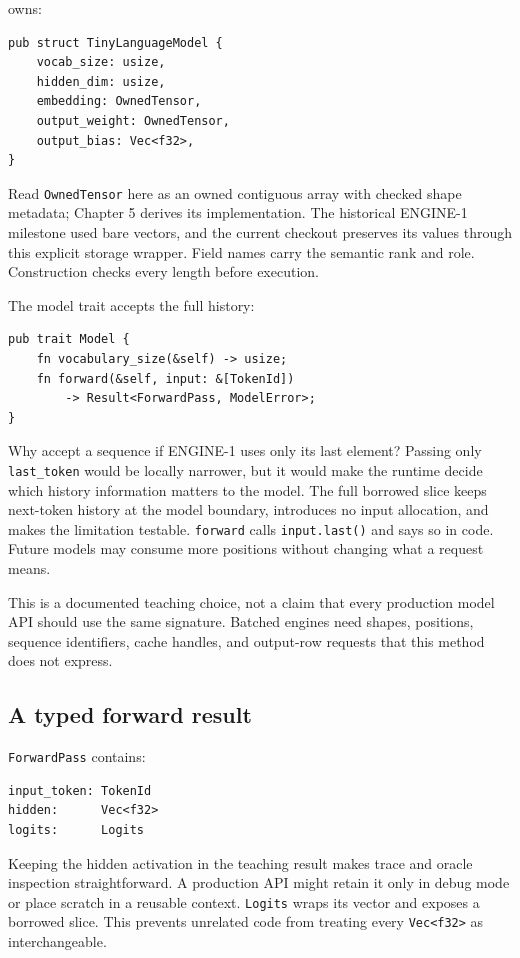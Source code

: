 \texttt{} owns:

\begin{verbatim}
pub struct TinyLanguageModel {
    vocab_size: usize,
    hidden_dim: usize,
    embedding: OwnedTensor,
    output_weight: OwnedTensor,
    output_bias: Vec<f32>,
}
\end{verbatim}

Read \texttt{OwnedTensor} here as an owned contiguous array with checked
shape metadata; Chapter 5 derives its implementation. The historical
ENGINE-1 milestone used bare vectors, and the current checkout preserves
its values through this explicit storage wrapper. Field names carry the
semantic rank and role. Construction checks every length before execution.

The model trait accepts the full history:

\begin{verbatim}
pub trait Model {
    fn vocabulary_size(&self) -> usize;
    fn forward(&self, input: &[TokenId])
        -> Result<ForwardPass, ModelError>;
}
\end{verbatim}

Why accept a sequence if ENGINE-1 uses only its last element? Passing
only \texttt{last\_token} would be locally narrower, but it would make
the runtime decide which history information matters to the model. The
full borrowed slice keeps next-token history at the model boundary,
introduces no input allocation, and makes the limitation testable.
\texttt{forward} calls \texttt{input.last()} and says so in code. Future
models may consume more positions without changing what a request means.

This is a documented teaching choice, not a claim that every production
model API should use the same signature. Batched engines need shapes,
positions, sequence identifiers, cache handles, and output-row requests
that this method does not express.

\subsection{A typed forward result}\label{a-typed-forward-result}

\texttt{ForwardPass} contains:

\begin{verbatim}
input_token: TokenId
hidden:      Vec<f32>
logits:      Logits
\end{verbatim}

Keeping the hidden activation in the teaching result makes trace and
oracle inspection straightforward. A production API might retain it only
in debug mode or place scratch in a reusable context. \texttt{Logits}
wraps its vector and exposes a borrowed slice. This prevents unrelated
code from treating every \texttt{Vec\textless{}f32\textgreater{}} as
interchangeable.

